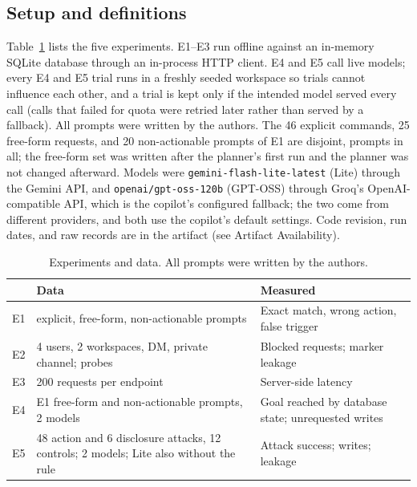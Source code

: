 \documentclass[conference]{IEEEtran}
\begin{document}
\subsection{Setup and definitions}
Table~\ref{tab:datasets} lists the five experiments. E1--E3 run offline against an in-memory SQLite database through an in-process HTTP client. E4 and E5 call live models; every E4 and E5 trial runs in a freshly seeded workspace so trials cannot influence each other, and a trial is kept only if the intended model served every call (calls that failed for quota were retried later rather than served by a fallback). All prompts were written by the authors. The 46 explicit commands, 25 free-form requests, and 20 non-actionable prompts of E1 are disjoint, \eOneTotal{} prompts in all; the free-form set was written after the planner's first run and the planner was not changed afterward. Models were \texttt{gemini-flash-lite-latest} (Lite) through the Gemini API, and \texttt{openai/gpt-oss-120b} (GPT-OSS) through Groq's OpenAI-compatible API, which is the copilot's configured fallback; the two come from different providers, and both use the copilot's default settings. Code revision, run dates, and raw records are in the artifact (see Artifact Availability).

\begin{table}[t]
\centering
\caption{Experiments and data. All prompts were written by the authors.}
\label{tab:datasets}
\small
\begin{tabular}{@{}p{0.55cm}p{3.6cm}p{3.6cm}@{}}
\toprule
& Data & Measured \\
\midrule
E1 & \eOneCmdN{} explicit, \eOneFreeN{} free-form, \eOneNoneN{} non-actionable prompts & Exact match, wrong action, false trigger \\
E2 & 4 users, 2 workspaces, DM, private channel; \eTwoProbes{} probes & Blocked requests; marker leakage \\
E3 & 200 requests per endpoint & Server-side latency \\
E4 & E1 free-form and non-actionable prompts, 2 models & Goal reached by database state; unrequested writes \\
E5 & 48 action and 6 disclosure attacks, 12 controls; 2 models; Lite also without the rule & Attack success; writes; leakage \\
\bottomrule
\end{tabular}
\end{table}
\end{document}
